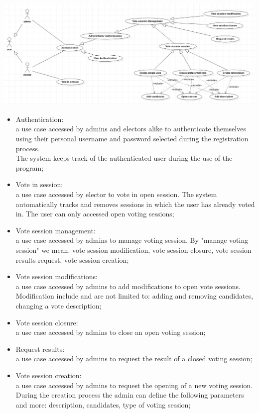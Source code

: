 \documentclass[11pt, oneside]{article}   	%
\begin{document}
\begin{center}
\includegraphics[scale=0.7]{images/usecaseDiagram.png}
\end{center}

\begin{itemize}
    \item Authentication: \\a use case accessed by admins and electors alike to authenticate themselves using their personal username and password selected during the registration process. \\
    The system keeps track of the authenticated user during the use of the program;
    \item Vote in session: \\a use case accessed by elector to vote in open session. The system automatically tracks and removes sessions in which the user has already voted in. The user can only accessed open voting sessions;
    \item Vote session management: \\a use case accessed by admins to manage voting session. By "manage voting session" we mean: vote session modification, vote session closure, vote session results request, vote session creation;
    \item Vote session modifications: \\a use case accessed by admins to add modifications to open vote sessions. Modification include and are not limited to: adding and removing candidates, changing a vote description;
    \item Vote session closure: \\a use case accessed by admins to close an open voting session;
    \item Request results:\\ a use case accessed by admins to request the result of a closed voting session;
    \item Vote session creation: \\a use case accessed by admins to request the opening of a new voting session. During the creation process the admin can define the following parameters and more: description, candidates, type of voting session;

\end{itemize}
\end{document}
